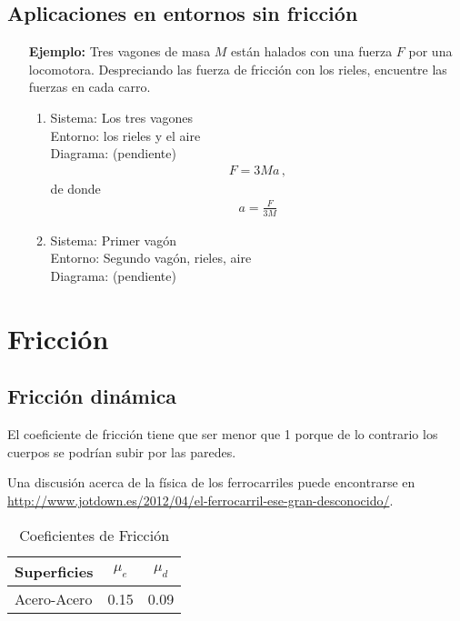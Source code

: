 \subsection{Aplicaciones en entornos sin fricción}







\begin{itemize}
\item[\textbf{Ejemplo:}] Tres vagones de masa $M$ están halados con una fuerza $F$ por una locomotora. Despreciando las fuerza de fricción con los rieles, encuentre las fuerzas en cada carro.
  \begin{enumerate}
  \item Sistema: Los tres vagones\\
  Entorno: los rieles y el aire\\
Diagrama: (pendiente)
  \begin{align}
    F=3M a\,,
  \end{align}
de donde
\begin{align}
  a=\frac{F}{3M}
\end{align}
\item Sistema: Primer vagón\\
Entorno: Segundo vagón, rieles, aire\\
Diagrama: (pendiente)

  \end{enumerate}
\end{itemize}
\section{Fricci\'on}

\subsection{Fricci\'on din\'amica}
El coeficiente de fricci\'on tiene que ser menor que 1 porque de lo contrario los cuerpos se podrían subir por las paredes.


Una discusión acerca de la física de los ferrocarriles puede encontrarse en \url{http://www.jotdown.es/2012/04/el-ferrocarril-ese-gran-desconocido/}.

\begin{table}
   \centering
   \begin{tabular}{|l|c|c|}\hline
    Superficies & $\mu_e$ & $\mu_d$\\\hline
     Acero-Acero & 0.15 & 0.09\\\hline
   \end{tabular}
  \caption{Coeficientes de Fricción}
   \label{tab:coeffric}
\end{table}

